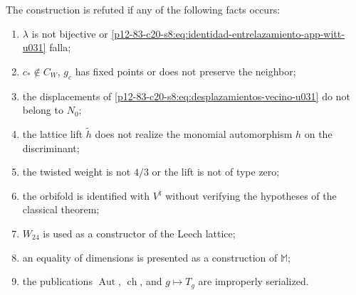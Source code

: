 \begin{criterion}
\label{p12-83-c20-s8:crit:refutacion-corredor-lunar-u031}
The construction is refuted if any of the following facts occurs:
\begin{enumerate}
 \item \(\lambda\) is not bijective or
       \eqref{p12-83-c20-s8:eq:identidad-entrelazamiento-app-witt-u031} falla;
 \item \(c_*\notin C_W\), \(g_c\) has fixed points or does not preserve the
       neighbor;
 \item the displacements of
       \eqref{p12-83-c20-s8:eq:desplazamientos-vecino-u031} do not belong to \(N_0\);
 \item the lattice lift \(\widetilde h\) does not realize the monomial
       automorphism \(h\) on the discriminant;
 \item the twisted weight is not \(4/3\) or the lift is not of type zero;
 \item the orbifold is identified with \(V^\natural\) without verifying the
       hypotheses of the classical theorem;
 \item \(W_{24}\) is used as a constructor of the Leech lattice;
 \item an equality of dimensions is presented as a construction of
       \(\mathbb M\);
 \item the publications
       \(\operatorname{Aut}\), \(\operatorname{ch}\), and \(g\mapsto T_g\) are improperly serialized.
\end{enumerate}
\end{criterion}
